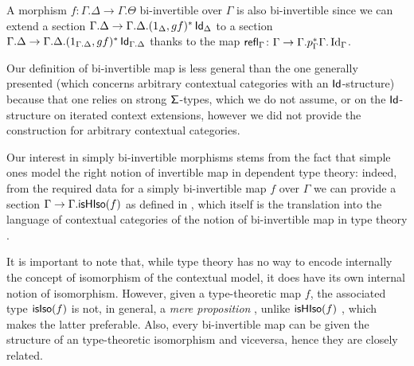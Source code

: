 \begin{rmk}
  A morphism $f\colon\Gamma.\Delta\rightarrow\Gamma.\Theta$ bi-invertible over
  $\Gamma$ is also bi-invertible since we can extend a section
  $\Gamma.\Delta\rightarrow\Gamma.\Delta.(1_\Delta,gf)^*\operatorname{\mathsf{Id}}_\Delta$
  to a section
  $\Gamma.\Delta\rightarrow\Gamma.\Delta.(1_{\Gamma.\Delta},gf)^*\operatorname{\mathsf{Id}}_{\Gamma.\Delta}$
  thanks to the map
  $\operatorname{\mathsf{refl}}_\Gamma\colon\Gamma\rightarrow\Gamma.p^*_\Gamma\Gamma.\operatorname{Id}_\Gamma$.
\end{rmk}

\begin{rmk}
  Our definition of bi-invertible map is less general than the one generally
  presented (which concerns arbitrary contextual categories with an
  $\operatorname{\mathsf{Id}}$-structure) because that one relies on strong $\operatorname{\mathsf{\Sigma}}$-types, which we
  do not assume, or on the $\operatorname{\mathsf{Id}}$-structure on iterated context extensions,
  however we did not provide the construction for arbitrary contextual
  categories.
\end{rmk}

\begin{rmk}
  Our interest in simply bi-invertible morphisms stems from the fact that simple
  ones model the right notion of invertible map in dependent type theory:
  indeed, from the
  required data for a simply bi-invertible map $f$ over $\Gamma$ we can provide
  a section $\Gamma\rightarrow\Gamma.\mathsf{isHIso}({f})$ 
  as defined in \cite[Def.~B.3.3]{KL12}, which itself is the translation into
  the language of contextual categories of the notion of bi-invertible map in
  type theory \cite[Def~4.3.1]{Uni13}.

\noindent
  It is important to note that, while type theory has no way to encode
  internally the concept of isomorphism of the contextual model, it does have
  its own internal notion of isomorphism. However, given a type-theoretic map
  $f$, the associated type $\mathsf{isIso}({f})$ is not, in general, a \emph{mere
  proposition} \cite[Def.\ 3.3.1]{Uni13}, unlike $\mathsf{isHIso}({f})$
  \cite[Thm.\ 4.3.2]{Uni13}, which makes the latter
  preferable. Also, every bi-invertible map can be given the structure of an
  type-theoretic isomorphism and viceversa, hence they are closely related.
\end{rmk}

